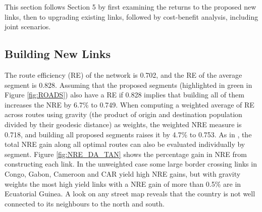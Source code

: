 \documentclass[a4paper]{article}
\begin{document}
This section follows \citet{krantz2024optimal} Section 5 by first examining the returns to the proposed new links, then to upgrading existing links, followed by cost-benefit analysis, including joint scenarios. %

\subsection{Building New Links}

The route efficiency (RE) of the network is 0.702, and the RE of the average segment is 0.828. Assuming that the proposed segments (highlighted in green in Figure \ref{fig:ROADS}) also have a RE if 0.828 implies that building all of them increases the NRE by 6.7\% to 0.749. When computing a weighted average of RE across routes using gravity (the product of origin and destination population divided by their geodesic distance) as weights, the weighted NRE measure is 0.718, and building all proposed segments raises it by 4.7\% to 0.753. As in \citet{krantz2024optimal}, the total NRE gain along all optimal routes can also be evaluated individually by segment. Figure \ref{fig:NRE_DA_TAN} shows the percentage gain in NRE from constructing each link. In the unweighted case some large border crossing links in Congo, Gabon, Cameroon and CAR yield high NRE gains, but with gravity weights the most high yield links with a NRE gain of more than 0.5\% are in Ecuatorial Guinea. A look on any street map reveals that the country is not well connected to its neighbours to the north and south.
\end{document}
